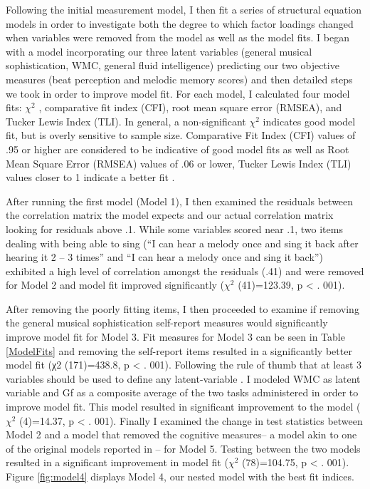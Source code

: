 \documentclass[12pt,]{book}
\begin{document}
Following the initial measurement model, I then fit a series of structural equation models in order to investigate both the degree to which factor loadings changed when variables were removed from the model as well as the model fits.
I began with a model incorporating our three latent variables (general musical sophistication, WMC, general fluid intelligence) predicting our two objective measures (beat perception and melodic memory scores) and then detailed steps we took in order to improve model fit.
For each model, I calculated four model fits: \(\chi^2\) , comparative fit index (CFI), root mean square error (RMSEA), and Tucker Lewis Index (TLI).
In general, a non-significant \(\chi^2\) indicates good model fit, but is overly sensitive to sample size.
Comparative Fit Index (CFI) values of .95 or higher are considered to be indicative of good model fits as well as Root Mean Square Error (RMSEA) values of .06 or lower, Tucker Lewis Index (TLI) values closer to 1 indicate a better fit \citep{beaujeanLatentVariableModeling2014}.

After running the first model (Model 1), I then examined the residuals between the correlation matrix the model expects and our actual correlation matrix looking for residuals above .1.
While some variables scored near .1, two items dealing with being able to sing (``I can hear a melody once and sing it back after hearing it 2 -- 3 times'' and ``I can hear a melody once and sing it back'') exhibited a high level of correlation amongst the residuals (.41) and were removed for Model 2 and model fit improved significantly (\(\chi^2\) (41)=123.39, p \textless{} . 001).

After removing the poorly fitting items, I then proceeded to examine if removing the general musical sophistication self-report measures would significantly improve model fit for Model 3.
Fit measures for Model 3 can be seen in Table \ref{ModelFits} and removing the self-report items resulted in a significantly better model fit (χ2 (171)=438.8, p \textless{} . 001).
Following the rule of thumb that at least 3 variables should be used to define any latent-variable \citep{beaujeanLatentVariableModeling2014}.
I modeled WMC as latent variable and Gf as a composite average of the two tasks administered in order to improve model fit.
This model resulted in significant improvement to the model (\(\chi^2\) (4)=14.37, p \textless{} . 001).
Finally I examined the change in test statistics between Model 2 and a model that removed the cognitive measures-- a model akin to one of the original models reported in \citep{mullensiefenMusicalityNonMusiciansIndex2014}-- for Model 5.
Testing between the two models resulted in a significant improvement in model fit (\(\chi^2\) (78)=104.75, p \textless{} . 001).
Figure \ref{fig:model4} displays Model 4, our nested model with the best fit indices.
\end{document}
